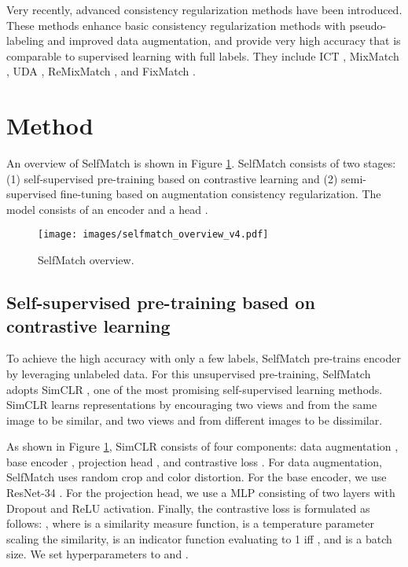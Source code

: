 \documentclass{article}
\begin{document}
Very recently, advanced consistency regularization methods have been introduced. These methods enhance basic consistency regularization methods with pseudo-labeling and improved data augmentation, and provide very high accuracy that is comparable to supervised learning with full labels. They include ICT \cite{verma2019interpolation}, MixMatch \cite{berthelot2019mixmatch}, UDA \cite{xie2020unsupervised}, ReMixMatch \cite{berthelot2020remixmatch}, and FixMatch \cite{sohn2020fixmatch}. \section{Method}
\label{section:method}

An overview of SelfMatch is shown in Figure \ref{fig:selfmatch-overview}. SelfMatch consists of two stages: (1) self-supervised pre-training based on contrastive learning and (2) semi-supervised fine-tuning based on augmentation consistency regularization. The model  consists of an encoder  and a head . 

\begin{figure}[t]
  \centering
  \texttt{[image: images/selfmatch\_overview\_v4.pdf]}
  \caption{SelfMatch overview.}
  \label{fig:selfmatch-overview}
\end{figure}

\subsection{Self-supervised pre-training based on contrastive learning}

To achieve the high accuracy with only a few labels, SelfMatch pre-trains encoder  by leveraging unlabeled data. For this unsupervised pre-training, SelfMatch adopts SimCLR \cite{chen2020simple}, one of the most promising self-supervised learning methods. SimCLR learns representations by encouraging two views  and  from the same image  to be similar, and two views  and   from different images to be dissimilar.

As shown in Figure \ref{fig:selfmatch-overview}, SimCLR consists of four components: data augmentation , base encoder , projection head , and contrastive loss . For data augmentation, SelfMatch uses random crop and  color distortion. For the base encoder, we use ResNet-34 \cite{he2016deep}. For the projection head, we use a MLP consisting of two layers with Dropout and ReLU activation. Finally, the contrastive loss is formulated as follows: , where  is a similarity measure function,  is a temperature parameter scaling the similarity,  is an indicator function evaluating to 1 iff , and  is a batch size. We set hyperparameters to  and .
\end{document}
